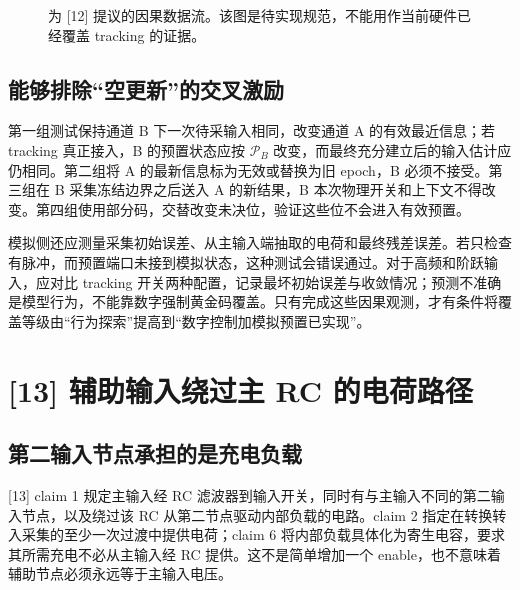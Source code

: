 \begin{figure}[H]\centering
{}
\caption{为 [12] 提议的因果数据流。该图是待实现规范，不能用作当前硬件已经覆盖 tracking 的证据。}
\end{figure}

\subsection{能够排除“空更新”的交叉激励}
第一组测试保持通道 B 下一次待采输入相同，改变通道 A 的有效最近信息；若 tracking 真正接入，B 的预置状态应按 \(\mathcal P_B\) 改变，而最终充分建立后的输入估计应仍相同。第二组将 A 的最新信息标为无效或替换为旧 epoch，B 必须不接受。第三组在 B 采集冻结边界之后送入 A 的新结果，B 本次物理开关和上下文不得改变。第四组使用部分码，交替改变未决位，验证这些位不会进入有效预置。

模拟侧还应测量采集初始误差、从主输入端抽取的电荷和最终残差误差。若只检查  有脉冲，而预置端口未接到模拟状态，这种测试会错误通过。对于高频和阶跃输入，应对比 tracking 开关两种配置，记录最坏初始误差与收敛情况；预测不准确是模型行为，不能靠数字强制黄金码覆盖。只有完成这些因果观测，才有条件将覆盖等级由“行为探索”提高到“数字控制加模拟预置已实现”。

\section{[13] 辅助输入绕过主 RC 的电荷路径}
\subsection{第二输入节点承担的是充电负载}
[13] claim 1 规定主输入经 RC 滤波器到输入开关，同时有与主输入不同的第二输入节点，以及绕过该 RC 从第二节点驱动内部负载的电路。claim 2 指定在转换转入采集的至少一次过渡中提供电荷；claim 6 将内部负载具体化为寄生电容，要求其所需充电不必从主输入经 RC 提供。这不是简单增加一个 enable，也不意味着辅助节点必须永远等于主输入电压。

